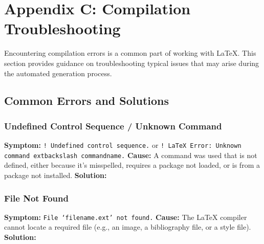 \documentclass{custom-academic-template}
\begin{document}
\section{Appendix C: Compilation Troubleshooting}
Encountering compilation errors is a common part of working with LaTeX. This section provides guidance on troubleshooting typical issues that may arise during the automated generation process.

\subsection{Common Errors and Solutions}

\subsubsection{Undefined Control Sequence / Unknown Command}
    	\textbf{Symptom:} 	\texttt{! Undefined control sequence.} or 	\texttt{! LaTeX Error: Unknown command 	extbackslash commandname.}
    	\textbf{Cause:} A command was used that is not defined, either because it's misspelled, requires a package not loaded, or is from a package not installed.
    	\textbf{Solution:}

\subsubsection{File Not Found}
    	\textbf{Symptom:} 	\texttt{File `filename.ext' not found.}
    	\textbf{Cause:} The LaTeX compiler cannot locate a required file (e.g., an image, a bibliography file, or a style file).
    	\textbf{Solution:}
\end{document}
